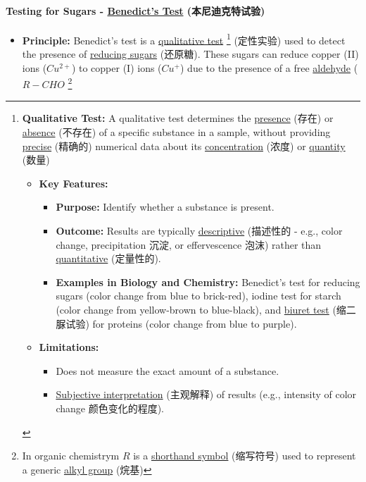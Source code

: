 \paragraph{Testing for Sugars - \underline{Benedict's Test} (本尼迪克特试验)}
\begin{itemize}
    \item \textbf{Principle:} Benedict's test is a \underline{qualitative test} \footnote{\textbf{Qualitative Test:} A qualitative
    test determines the \underline{presence} (存在) or \underline{absence} (不存在) of a specific substance in a sample, without
    providing \underline{precise} (精确的) numerical data about its \underline{concentration} (浓度) or \underline{quantity} (数量)
    \begin{itemize}
        \item \textbf{Key Features:}
        \begin{itemize}
            \item \textbf{Purpose:} Identify whether a substance is present.
            \item \textbf{Outcome:} Results are typically \underline{descriptive} (描述性的 - e.g., color change, precipitation
            沉淀, or effervescence 泡沫) rather than \underline{quantitative} (定量性的).
            \item \textbf{Examples in Biology and Chemistry:} Benedict's test for reducing sugars (color change from blue to
            brick-red), iodine test for starch (color change from yellow-brown to blue-black), and \underline{biuret test}
            (缩二脲试验) for proteins (color change from blue to purple).
        \end{itemize}
        \item \textbf{Limitations:}
        \begin{itemize}
            \item Does not measure the exact amount of a substance.
            \item \underline{Subjective interpretation} (主观解释)  of results (e.g., intensity of color change 颜色变化的程度).
        \end{itemize}
    \end{itemize}} (定性实验) used to detect the presence of \underline{reducing sugars} (还原糖). These sugars can reduce copper
    (II) ions ($Cu^{2+}$) to copper (I) ions ($Cu^+$) due to the presence of a free \underline{aldehyde} ($R-CHO$ \footnote{In
    organic chemistrym $R$ is a \underline{shorthand symbol} (缩写符号) used to represent a generic \underline{alkyl group} (烷基)
}
\end{itemize}

